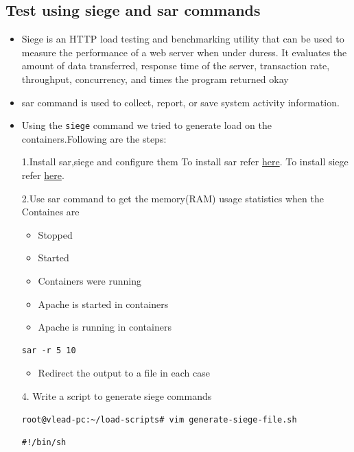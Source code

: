 \documentclass[11pt]{article}
\begin{document}
\subsection{Test using siege and sar commands}
\label{sec:orgheadline46}
\begin{itemize}
\item Siege is an HTTP load testing and benchmarking utility that can be used to
measure the performance of a web server when under duress. It evaluates the
amount of data transferred, response time of the server, transaction rate,
throughput, concurrency, and times the program returned okay
\item sar command is used to collect, report, or save system activity information.
\item Using the \texttt{siege} command we tried to generate load on the
containers.Following are the steps:

\item[{1.Install sar,siege and configure them}] To install sar refer \href{http://www.vishalvyas.com/2012/05/installing-system-activity-reporter-sar.html}{here}.
To install siege refer \href{https://www.linode.com/docs/tools-reference/tools/load-testing-with-siege}{here}.
\item[{2.Use sar command to get the memory(RAM) usage statistics when the Containes are}] \begin{itemize}
\item Stopped
\item Started
\item Containers were running
\item Apache is started in containers
\item Apache is running in containers
\end{itemize}
\begin{verbatim}
sar -r 5 10
\end{verbatim}
\begin{itemize}
\item Redirect the output to a file in each case
\end{itemize}
\item[{4. Write a script to generate siege commands}] \begin{verbatim}
root@vlead-pc:~/load-scripts# vim generate-siege-file.sh
\end{verbatim}
\begin{verbatim}
#!/bin/sh


\end{verbatim}
\end{itemize}
\end{document}
